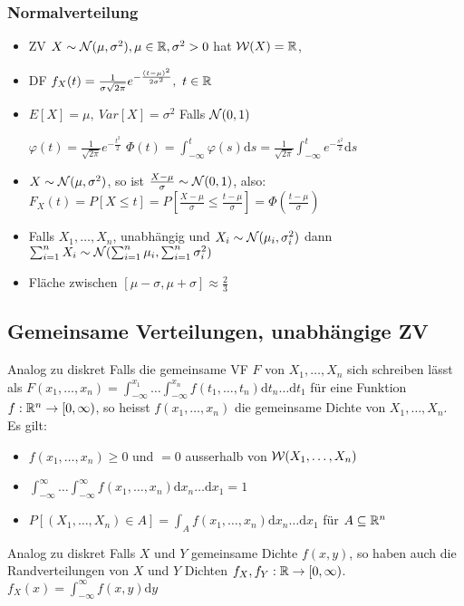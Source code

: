 \subsubsection{Normalverteilung}
\begin{itemize}
    \item ZV $X \sim \mathcal{N}(\mu, \sigma^2), \mu \in \mathbb{R}, \sigma^2 > 0$ hat $\mathcal{W}(X) = \mathbb{R}$, 
    \item DF $f_X(t) = \frac{1}{\sigma \sqrt{2 \pi}} e^{- \frac{(t - \mu)^2}{2 \sigma^2}}, \ t \in \mathbb{R}$
    \item $E[X] = \mu, \ Var[X] = \sigma^2$
     Falls $\mathcal{N}(0, 1)$
        \begin{itemize}
             $\varphi(t) = \frac{1}{\sqrt{2 \pi}} e^{-\frac{t^2}{2}}$
             $\Phi(t) = \int_{-\infty}^{t} \varphi(s) \mathrm{d}s = \frac{1}{\sqrt{2 \pi}} \int_{-\infty}^{t} e ^{-\frac{s^2}{2}}\mathrm{d}s$
        \end{itemize}
    \item $X \sim \mathcal{N}(\mu, \sigma^2)$, so ist $\frac{X - \mu}{\sigma} \sim \mathcal{N}(0, 1)$, also: $F_X(t) = P[X \le t] = P[\frac{X - \mu}{\sigma} \le \frac{t - \mu}{\sigma}] = \Phi(\frac{t - \mu}{\sigma})$
    \item Falls $X_1, \dots, X_n$, unabhängig und $X_i \sim \mathcal{N}(\mu_i, \sigma_i^2)$ dann $\sum_{i=1}^n X_i \sim \mathcal{N}(\sum_{i=1}^n \mu_i, \sum_{i=1}^n \sigma_i^2)$
    \item Fläche zwischen $[\mu - \sigma, \mu + \sigma] \approx \frac{2}{3}$
\end{itemize}

\subsection{Gemeinsame Verteilungen, unabhängige ZV}
\begin{itemize}
     Analog zu diskret
     Falls die gemeinsame VF $F$ von $X_1, \dots, X_n$ sich schreiben lässt als $F(x_1, \dots, x_n) = \int_{-\infty}^{x_1} \dots \int_{-\infty}^{x_n} f(t_1, \dots, t_n) \mathrm{d}t_n \dots \mathrm{d}t_1$ für eine Funktion $f: \mathbb{R}^n \to [0, \infty)$, so heisst $f(x_1, \dots, x_n)$ die gemeinsame Dichte von $X_1, \dots, X_n$. Es gilt:
        \begin{itemize}
            \item $f(x_1, \dots, x_n) \ge 0$ und $=0$ ausserhalb von $\mathcal{W}(X_1, \dots, X_n)$
            \item $\int_{-\infty}^{\infty} \dots \int_{-\infty}^{\infty} f(x_1, \dots, x_n) \mathrm{d}x_n \dots \mathrm{d}x_1 = 1$
            \item $P[(X_1, \dots, X_n) \in A] = \int_{A} f(x_1, \dots, x_n) \mathrm{d}x_n \dots \mathrm{d}x_1$ für $A \subseteq \mathbb{R}^n$
        \end{itemize}
     Analog zu diskret
     Falls $X$ und $Y$ gemeinsame Dichte $f(x,y)$, so haben auch die Randverteilungen von $X$ und $Y$ Dichten $f_X, f_Y: \mathbb{R} \to [0, \infty)$. $f_X(x) = \int_{-\infty}^{\infty} f(x, y) \mathrm{d}y$
\end{itemize}

